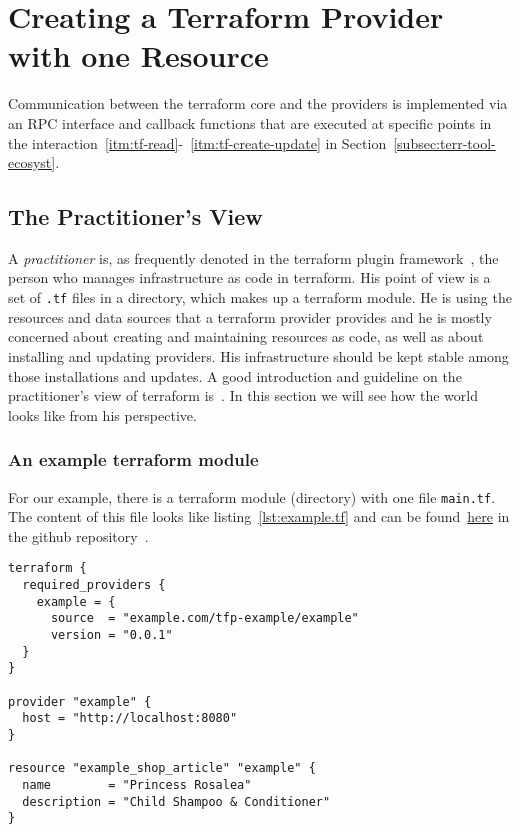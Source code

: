 \documentclass[paper=a4,11pt,numbers=noenddot]{article}
\begin{document}
\section{Creating a Terraform Provider with one Resource}
\label{sec:creat-terr-prov}

Communication between the terraform core and the providers is implemented via an RPC interface and callback functions that are executed at specific points in the interaction~\ref{itm:tf-read}-~\ref{itm:tf-create-update} in Section~\ref{subsec:terr-tool-ecosyst}.

\subsection{The Practitioner's View}
\label{subsec:practitioners-view}

A \emph{practitioner} is, as frequently denoted in the terraform plugin framework~\autocite{noauthor_terraform_framework_nodate}, the person who manages infrastructure as code in terraform. His point of view is a set of \verb'.tf' files in a directory, which makes up a terraform module. He is using the resources and data sources that a terraform provider provides and he is mostly concerned about creating and maintaining resources as code, as well as about installing and updating providers. His infrastructure should be kept stable among those installations and updates. A good introduction and guideline on the practitioner's view of terraform is~\autocite{brikman_terraform_2022}. In this section we will see how the world looks like from his perspective.

\subsubsection{An example terraform module}
\label{subsubsec:an-example-terraform}

For our example, there is a terraform module (directory) with one file \verb'main.tf'. The content of this file looks like listing~\ref{lst:example.tf} and can be found~\href{https://github.com/ecky-l/terraform-provider-example/blob/main/src/exampletf}{here} in the github repository~\autocite{ecky-l_terraform-provider-example_nodate}.

\begin{lstlisting}[label=lst:example.tf]
terraform {
  required_providers {
    example = {
      source  = "example.com/tfp-example/example"
      version = "0.0.1"
  }
}

provider "example" {
  host = "http://localhost:8080"
}

resource "example_shop_article" "example" {
  name        = "Princess Rosalea"
  description = "Child Shampoo & Conditioner"
}
\end{lstlisting}
\end{document}
